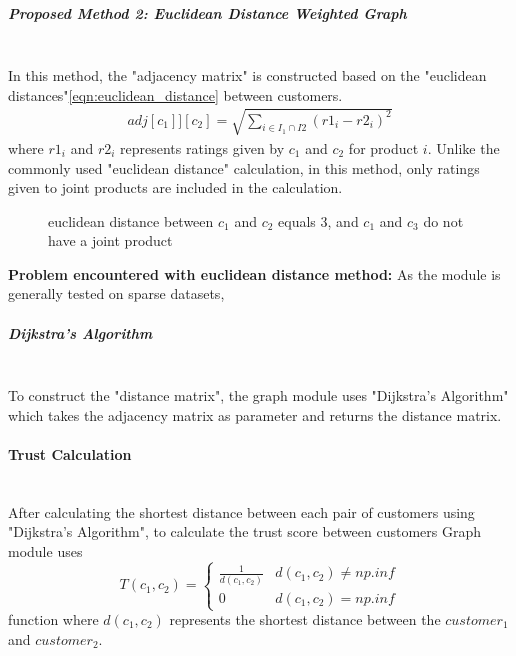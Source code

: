 	\subparagraph{Proposed Method 2: Euclidean Distance Weighted Graph}\mbox{}\\
	In this method, the "adjacency matrix" is constructed based on the "euclidean distances"\ref{eqn:euclidean_distance} between customers. 
	\begin{equation} 
	\label{eqn:euclidean_distance}
	\begin{split}
	adj[c_{1}]][c_{2}] = \sqrt{\sum_{i\in I_{1}\cap I{2}}^{} (r1_{i}-r2_{i})^2}
	\end{split}
	\end{equation}
	where $r1_{i}$ and $r2_{i}$ represents ratings given by $c_{1}$ and $c_{2}$ for product $i$. Unlike the commonly used "euclidean distance" calculation, in this method, only ratings given to joint products are included in the calculation.
	\begin{figure}[H]
		\centering
		\caption{euclidean distance between $c_{1}$ and $c_{2}$ equals 3, and $c_{1}$ and $c_{3}$ do not have a joint product}
	\end{figure}
	\textbf{Problem encountered with euclidean distance method:} As the module is generally tested on sparse datasets, 
	
	\subparagraph{Dijkstra's Algorithm}\mbox{}\\
	To construct the "distance matrix", the graph module uses "Dijkstra's Algorithm"\cite{Dijkstra} which takes the adjacency matrix as parameter and returns the distance matrix.
	
	\paragraph{Trust Calculation}\mbox{}\\
	After calculating the shortest distance between each pair of customers using "Dijkstra's Algorithm", to calculate the trust score between customers Graph module uses
	\begin{equation*} 
	T(c_{1}, c_{2})= \left\{
	\begin{array}{lr} 
	\frac{1}{d(c_{1}, c_{2})} & d(c_{1}, c_{2}) \neq np.inf \\
	0 & d(c_{1}, c_{2}) = np.inf
	\end{array}
	\right.
	\end{equation*}
	function where $d(c_{1}, c_{2})$ represents the shortest distance between the $customer_{1}$ and $customer_{2}$. \\
	
